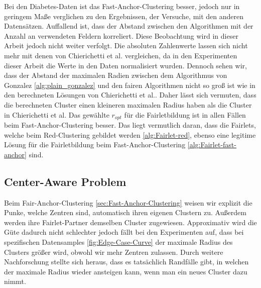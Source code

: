     Bei den Diabetes-Daten \cite{misc_diabetes_130_richtig} ist das Fast-Anchor-Clustering besser, jedoch nur in geringem Maße verglichen zu den Ergebnissen, der Versuche, mit den anderen Datensätzen. Auffallend ist, dass der Abstand zwischen den Algorithmen mit der Anzahl an verwendeten Feldern korreliert. Diese Beobachtung wird in dieser Arbeit jedoch nicht weiter verfolgt. Die absoluten Zahlenwerte lassen sich nicht mehr mit denen von Chierichetti et al. \cite{chierichetti2018fair} vergleichen, da in den Experimenten dieser Arbeit die Werte in den Daten normalisiert wurden. Dennoch sehen wir, dass der Abstand der maximalen Radien zwischen dem Algorithmus von Gonzalez \ref{alg:plain_gonzalez} und den fairen Algorithmen nicht so groß ist wie in den berechneten Lösungen von Chierichetti et al.\cite{chierichetti2018fair}. Daher lässt sich vermuten, dass die berechneten Cluster einen kleineren maximalen Radius haben als die Cluster in Chierichetti et al. \cite{chierichetti2018fair} \newline
    Das gewählte $r_{opt}$ für die Fairletbildung ist in allen Fällen beim Fast-Anchor-Clustering besser. Das liegt vermutlich daran, dass die Fairlets, welche beim Red-Clustering gebildet werden \ref{alg:Fairlet-red}, ebenso eine legitime Lösung für die Fairletbildung beim Fast-Anchor-Clustering \ref{alg:Fairlet-fast-anchor} sind.


    
    \subsection{Center-Aware Problem} \label{sec:center-aware-auswertung}
        Beim Fair-Anchor-Clustering \ref{sec:Fast-Anchor-Clustering} weisen wir explizit die Punke, welche Zentren sind, automatisch ihren eigenen Clustern zu. Außerdem werden ihre Fairlet-Partner demselben Cluster zugewiesen. Approximativ wird die Güte dadurch nicht schlechter \cite{BA_Clustering_Irina} jedoch fällt bei den Experimenten auf, dass bei spezifischen Datensamples \ref{fig:Edge-Case-Curve} der maximale Radius des Clusters größer wird, obwohl wir mehr Zentren zulassen. \newline
        Durch weitere Nachforschung stellte sich heraus, dass es tatsächlich Randfälle gibt, in welchen der maximale Radius wieder ansteigen kann, wenn man ein neues Cluster dazu nimmt.

